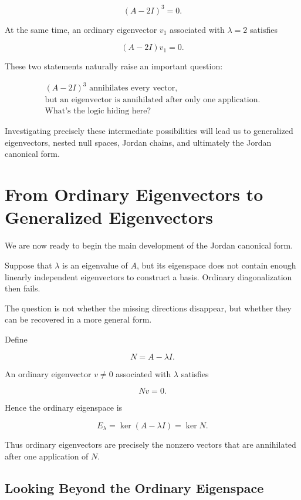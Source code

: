 \documentclass[11pt]{article}
\begin{document}
\[
(A-2I)^3=0.
\]

At the same time, an ordinary eigenvector \(v_1\) associated with
\(\lambda=2\) satisfies

\[
(A-2I)v_1=0.
\]

These two statements naturally raise an important question:

\[
\boxed{
\begin{gathered}
(A-2I)^3 \text{ annihilates every vector,}\\
\text{but an eigenvector is annihilated after only one application.}\\[2mm]
\text{What's the logic hiding here?}
\end{gathered}
}
\]

Investigating precisely these intermediate possibilities will lead us
to generalized eigenvectors, nested null spaces, Jordan chains, and
ultimately the Jordan canonical form.


\section{From Ordinary Eigenvectors to Generalized Eigenvectors}

We are now ready to begin the main development of the Jordan canonical
form.

Suppose that \(\lambda\) is an eigenvalue of \(A\), but its eigenspace
does not contain enough linearly independent eigenvectors to construct
a basis.  Ordinary diagonalization then fails.

The question is not whether the missing directions disappear, but
whether they can be recovered in a more general form.

Define

\[
\boxed{
N=A-\lambda I.
}
\]

An ordinary eigenvector \(v\neq 0\) associated with \(\lambda\)
satisfies

\[
Nv=0.
\]

Hence the ordinary eigenspace is

\[
\boxed{
E_\lambda
=
\ker(A-\lambda I)
=
\ker N.
}
\]

Thus ordinary eigenvectors are precisely the nonzero vectors that are
annihilated after one application of \(N\).


\subsection{Looking Beyond the Ordinary Eigenspace}
\end{document}
